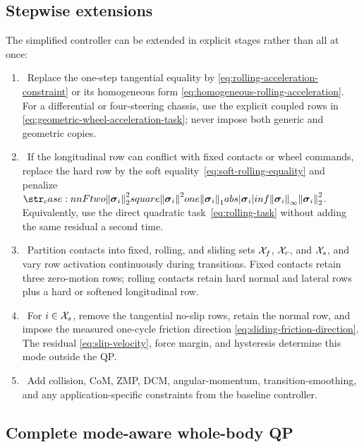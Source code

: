 \documentclass[10pt]{article}
\newcommand{\slackVariable}{\bs{\sigma}}
\begin{document}
\subsection{Stepwise extensions}

The simplified controller can be extended in explicit stages rather than all
at once:
\begin{enumerate}
  \item {}\ Replace the
    one-step tangential equality by
    \eqref{eq:rolling-acceleration-constraint} or its homogeneous form
    \eqref{eq:homogeneous-rolling-acceleration}. For a differential or
    four-steering chassis, use the explicit coupled rows in
    \eqref{eq:geometric-wheel-acceleration-task}; never impose both generic
    and geometric copies.
  \item {}\ If the longitudinal row can conflict
    with fixed contacts or wheel commands, replace the hard row by the soft
    equality~\eqref{eq:soft-rolling-equality} and penalize
    $\norm{\slackVariable_i}_2^2$. Equivalently, use the direct quadratic
    task~\eqref{eq:rolling-task} without adding the same residual a second
    time.
  \item {}\ Partition contacts
    into fixed, rolling, and sliding sets $\mathcal{X}_{f}$, $\mathcal{X}_{r}$, and
    $\mathcal{X}_{s}$, and vary row activation continuously during transitions.
    Fixed contacts retain three zero-motion rows; rolling contacts retain
    hard normal and lateral rows plus a hard or softened longitudinal row.
  \item {}\ For $i\in\mathcal{X}_{s}$,
    remove the tangential no-slip rows, retain the normal row, and impose the
    measured one-cycle friction direction
    \eqref{eq:sliding-friction-direction}. The residual
    \eqref{eq:slip-velocity}, force margin, and hysteresis determine this
    mode outside the QP.
  \item {}\ Add collision,
    CoM, ZMP, DCM, angular-momentum, transition-smoothing, and any
    application-specific constraints from the baseline controller.
\end{enumerate}

\subsection{Complete mode-aware whole-body QP}
\end{document}
